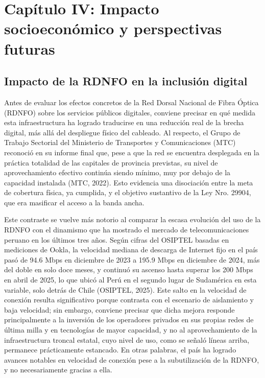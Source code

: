 \section{Capítulo IV: Impacto socioeconómico y perspectivas futuras}

\subsection{Impacto de la RDNFO en la inclusión digital}
Antes de evaluar los efectos concretos de la Red Dorsal Nacional de Fibra Óptica (RDNFO) sobre los servicios públicos digitales, conviene precisar en qué medida esta infraestructura ha logrado traducirse en una reducción real de la brecha digital, más allá del despliegue físico del cableado. Al respecto, el Grupo de Trabajo Sectorial del Ministerio de Transportes y Comunicaciones (MTC) reconoció en su informe final que, pese a que la red se encuentra desplegada en la práctica totalidad de las capitales de provincia previstas, su nivel de aprovechamiento efectivo continúa siendo mínimo, muy por debajo de la capacidad instalada (MTC, 2022). Esto evidencia una disociación entre la meta de cobertura física, ya cumplida, y el objetivo sustantivo de la Ley Nro. 29904, que era masificar el acceso a la banda ancha.

Este contraste se vuelve más notorio al comparar la escasa evolución del uso de la RDNFO con el dinamismo que ha mostrado el mercado de telecomunicaciones peruano en los últimos tres años. Según cifras del OSIPTEL basadas en mediciones de Ookla, la velocidad mediana de descarga de Internet fijo en el país pasó de 94.6 Mbps en diciembre de 2023 a 195.9 Mbps en diciembre de 2024, más del doble en solo doce meses, y continuó su ascenso hasta superar los 200 Mbps en abril de 2025, lo que ubicó al Perú en el segundo lugar de Sudamérica en esta variable, solo detrás de Chile (OSIPTEL, 2025). Este salto en la velocidad de conexión resulta significativo porque contrasta con el escenario de aislamiento y baja velocidad; sin embargo, conviene precisar que dicha mejora responde principalmente a la inversión de los operadores privados en sus propias redes de última milla y en tecnologías de mayor capacidad, y no al aprovechamiento de la infraestructura troncal estatal, cuyo nivel de uso, como se señaló líneas arriba, permanece prácticamente estancado. En otras palabras, el país ha logrado avances notables en velocidad de conexión pese a la subutilización de la RDNFO, y no necesariamente gracias a ella.

